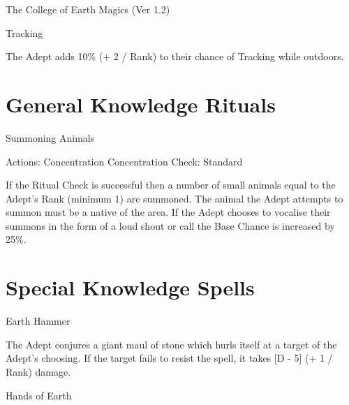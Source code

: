 \begin{Chapter}{The College of Earth Magics (Ver 1.2)}
\begin{spell}[G-11]{Tracking }

\begin{effects}
The Adept adds 10\% (+ 2 / Rank) to their chance of Tracking while outdoors.
\end{effects}
\end{spell}

\section{General Knowledge Rituals}

\begin{ritual}[Q-1]{Summoning Animals }

Actions: Concentration 
Concentration Check: Standard 
\begin{effects}
If the Ritual Check is successful then a number of small animals equal
to the Adept’s Rank (minimum 1) are summoned. The animal the Adept
attempts to summon must be a native of the area. If the Adept chooses
to vocalise their summons in the form of a loud shout or call the Base
Chance is increased by 25\%.
\end{effects}
\end{ritual}

\section{Special Knowledge Spells}

\begin{spell}[S-1]{Earth Hammer }

\begin{effects}
The Adept conjures a giant maul of stone which hurls itself at a
target of the Adept’s choosing. If the target fails to resist the
spell, it takes [D - 5] (+ 1 / Rank) damage.
\end{effects}
\end{spell}

\begin{spell}[S-2]{Hands of Earth }


\end{spell}
\end{Chapter}
